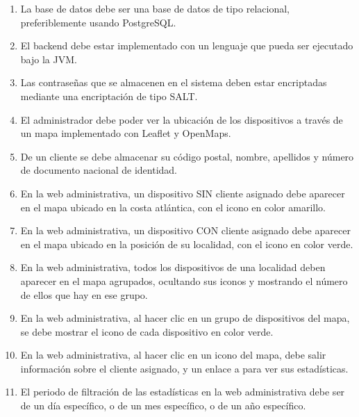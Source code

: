 \begin{enumerate}[label=NF\arabic* -]

    \item La base de datos debe ser una base de datos de tipo relacional, preferiblemente usando PostgreSQL.
    
    \item El backend debe estar implementado con un lenguaje que pueda ser ejecutado bajo la JVM.
    
    \item Las contraseñas que se almacenen en el sistema deben estar encriptadas mediante una encriptación de tipo SALT.
    
    \item El administrador debe poder ver la ubicación de los dispositivos a través de un mapa implementado con Leaflet y OpenMaps.
    
    \item De un cliente se debe almacenar su código postal, nombre, apellidos y número de documento nacional de identidad.
    
    \item En la web administrativa, un dispositivo SIN cliente asignado debe aparecer en el mapa ubicado en la costa atlántica, con el icono en color amarillo.
    
    \item En la web administrativa, un dispositivo CON cliente asignado debe aparecer en el mapa ubicado en la posición de su localidad, con el icono en color verde.
    
    \item En la web administrativa, todos los dispositivos de una localidad deben aparecer en el mapa agrupados, ocultando sus iconos y mostrando el número de ellos que hay en ese grupo.
    
    \item En la web administrativa, al hacer clic en un grupo de dispositivos del mapa, se debe mostrar el icono de cada dispositivo en color verde.
    
    \item En la web administrativa, al hacer clic en un icono del mapa, debe salir información sobre el cliente asignado, y un enlace a para ver sus estadísticas.
    
    \item El periodo de filtración de las estadísticas en la web administrativa debe ser de un día específico, o de un mes específico, o de un año específico.
    

\end{enumerate}
